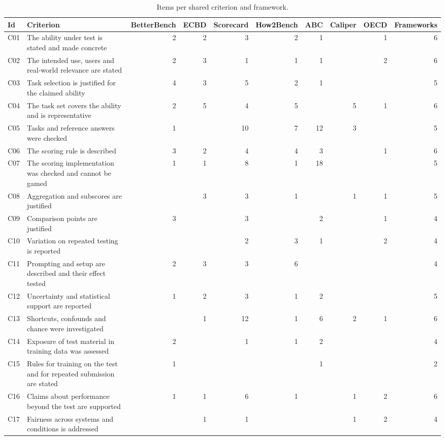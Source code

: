 \documentclass[10pt,conference]{IEEEtran}
\begin{document}
\begin{table}[t]
\caption{Items per shared criterion and framework.}
\label{tab:coverage}
\centering
\small
\begin{tabular}{@{}llrrrrrrrr@{}}
\toprule
\textbf{Id} & \textbf{Criterion} & \textbf{BetterBench} & \textbf{ECBD} & \textbf{Scorecard} & \textbf{How2Bench} & \textbf{ABC} & \textbf{Caliper} & \textbf{OECD} & \textbf{Frameworks} \\
\midrule
C01 & The ability under test is stated and made concrete & 2 & 2 & 3 & 2 & 1 &  & 1 & 6 \\
C02 & The intended use, users and real-world relevance are stated & 2 & 3 & 1 & 1 & 1 &  & 2 & 6 \\
C03 & Task selection is justified for the claimed ability & 4 & 3 & 5 & 2 & 1 &  &  & 5 \\
\midrule
C04 & The task set covers the ability and is representative & 2 & 5 & 4 & 5 &  & 5 & 1 & 6 \\
C05 & Tasks and reference answers were checked & 1 &  & 10 & 7 & 12 & 3 &  & 5 \\
\midrule
C06 & The scoring rule is described & 3 & 2 & 4 & 4 & 3 &  & 1 & 6 \\
C07 & The scoring implementation was checked and cannot be gamed & 1 & 1 & 8 & 1 & 18 &  &  & 5 \\
C08 & Aggregation and subscores are justified &  & 3 & 3 & 1 &  & 1 & 1 & 5 \\
C09 & Comparison points are justified & 3 &  & 3 &  & 2 &  & 1 & 4 \\
\midrule
C10 & Variation on repeated testing is reported &  &  & 2 & 3 & 1 &  & 2 & 4 \\
C11 & Prompting and setup are described and their effect tested & 2 & 3 & 3 & 6 &  &  &  & 4 \\
C12 & Uncertainty and statistical support are reported & 1 & 2 & 3 & 1 & 2 &  &  & 5 \\
C13 & Shortcuts, confounds and chance were investigated &  & 1 & 12 & 1 & 6 & 2 & 1 & 6 \\
\midrule
C14 & Exposure of test material in training data was assessed & 2 &  & 1 & 1 & 2 &  &  & 4 \\
C15 & Rules for training on the test and for repeated submission are stated & 1 &  &  &  & 1 &  &  & 2 \\
C16 & Claims about performance beyond the test are supported & 1 & 1 & 6 & 1 &  & 1 & 2 & 6 \\
C17 & Fairness across systems and conditions is addressed &  & 1 & 1 &  &  & 1 & 2 & 4 \\

\end{tabular}
\end{table}
\end{document}
